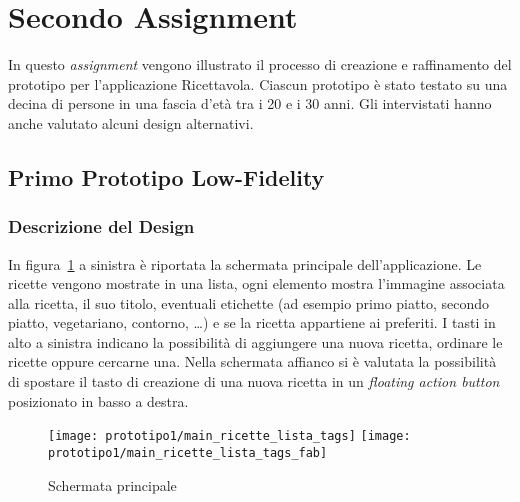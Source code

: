 







\section{Secondo Assignment}
In questo \textit{assignment} vengono illustrato il processo di creazione e raffinamento del prototipo per l'applicazione Ricettavola.
Ciascun prototipo è stato testato su una decina di persone in una fascia d'età tra i 20 e i 30 anni.
Gli intervistati hanno anche valutato alcuni design alternativi.


\subsection{Primo Prototipo Low-Fidelity}

\subsubsection{Descrizione del Design}

In figura~\ref{fig:p1_main} a sinistra è riportata la schermata principale dell'applicazione.
Le ricette vengono mostrate in una lista, ogni elemento mostra l'immagine associata alla ricetta, il suo titolo, eventuali etichette (ad esempio primo piatto, secondo piatto, vegetariano, contorno, \dots ) e se la ricetta appartiene ai preferiti.
I tasti in alto a sinistra indicano la possibilità di aggiungere una nuova ricetta, ordinare le ricette oppure cercarne una.
Nella schermata affianco si è valutata la possibilità di spostare il tasto di creazione di una nuova ricetta in un \textit{floating action button} posizionato in basso a destra.

\begin{figure}[ht]
  \begin{center}
    \texttt{[image: prototipo1/main\_ricette\_lista\_tags]}
    \texttt{[image: prototipo1/main\_ricette\_lista\_tags\_fab]}
    \caption{Schermata principale}
    \label{fig:p1_main}
  \end{center}
\end{figure}

